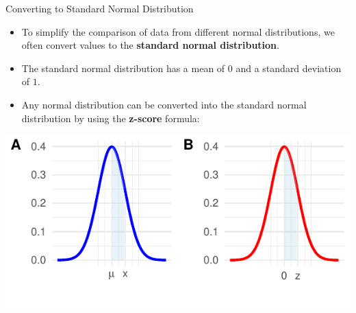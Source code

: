 \documentclass[
  ignorenonframetext,
]{beamer}
\providecommand{\tightlist}{%
  \setlength{\itemsep}{0pt}\setlength{\parskip}{0pt}}
\begin{document}
\begin{frame}{Converting to Standard Normal Distribution}
\label{converting-to-standard-normal-distribution}
\begin{itemize}
\tightlist
\item
  To simplify the comparison of data from different normal
  distributions, we often convert values to the \textbf{standard normal
  distribution}.
\end{itemize}

\begin{itemize}
\tightlist
\item
  The standard normal distribution has a mean of \(0\) and a standard
  deviation of \(1\).
\end{itemize}

\begin{itemize}
\tightlist
\item
  Any normal distribution can be converted into the standard normal
  distribution by using the \textbf{z-score} formula:
\end{itemize}

\includegraphics{M5-Hypothesis-Testing,-Probability-and-Distribution_files/figure-beamer/unnamed-chunk-2-1.pdf}
\end{frame}
\end{document}
